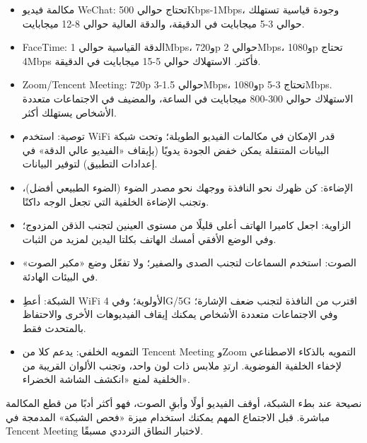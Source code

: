 
\begin{itemize}
  \item مكالمة فيديو WeChat: تحتاج حوالي 500Kbps-1Mbps، وجودة قياسية تستهلك حوالي 3-5 ميجابايت في الدقيقة، والدقة العالية حوالي 8-12 ميجابايت.
  \item FaceTime: الدقة القياسية حوالي 1Mbps، و720p حوالي 2Mbps، و1080p تحتاج 4Mbps فأكثر. الاستهلاك حوالي 5-15 ميجابايت في الدقيقة.
  \item Zoom/Tencent Meeting: 720p حوالي 1.5-3Mbps، و1080p تحتاج 3-5Mbps. الاستهلاك حوالي 300-800 ميجابايت في الساعة، والمضيف في الاجتماعات متعددة الأشخاص يستهلك أكثر.
  \item توصية: استخدم WiFi قدر الإمكان في مكالمات الفيديو الطويلة؛ وتحت شبكة البيانات المتنقلة يمكن خفض الجودة يدويًا (بإيقاف «الفيديو عالي الدقة» في إعدادات التطبيق) لتوفير البيانات.
\end{itemize}


\begin{itemize}
  \item الإضاءة: كن ظهرك نحو النافذة ووجهك نحو مصدر الضوء (الضوء الطبيعي أفضل)، وتجنب الإضاءة الخلفية التي تجعل الوجه داكنًا.
  \item الزاوية: اجعل كاميرا الهاتف أعلى قليلًا من مستوى العينين لتجنب الذقن المزدوج؛ وفي الوضع الأفقي أمسك الهاتف بكلتا اليدين لمزيد من الثبات.
  \item الصوت: استخدم السماعات لتجنب الصدى والصفير؛ ولا تفعّل وضع «مكبر الصوت» في البيئات الهادئة.
  \item الشبكة: أعطِ WiFi الأولوية؛ وفي 4G/5G اقترب من النافذة لتجنب ضعف الإشارة؛ وفي الاجتماعات متعددة الأشخاص يمكنك إيقاف الفيديوهات الأخرى والاحتفاظ بالمتحدث فقط.
  \item التمويه الخلفي: يدعم كلا من Tencent Meeting وZoom التمويه بالذكاء الاصطناعي لإخفاء الخلفية الفوضوية. ارتدِ ملابس ذات لون واحد، وتجنب الألوان القريبة من الخلفية لمنع «انكشف الشاشة الخضراء».
\end{itemize}

\begin{tcbinfo}{نصيحة}
عند بطء الشبكة، أوقف الفيديو أولًا وأبقِ الصوت، فهو أكثر أدبًا من قطع المكالمة مباشرة. قبل الاجتماع المهم يمكنك استخدام ميزة «فحص الشبكة» المدمجة في Tencent Meeting لاختبار النطاق الترددي مسبقًا.

\end{tcbinfo}

